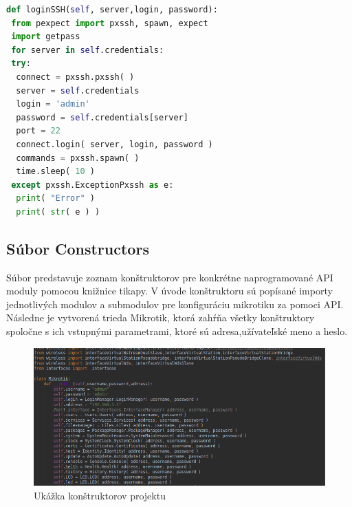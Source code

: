 \begin{lstlisting}[language=python, frame=single, caption=Metóda hromadného prihlásenia pomocou protokolu SSH,captionpos=b, showstringspaces=false, basicstyle=\footnotesize]
 def loginSSH(self, server,login, password):
 from pexpect import pxssh, spawn, expect
 import getpass
 for server in self.credentials:
 try:
  connect = pxssh.pxssh( )
  server = self.credentials
  login = 'admin'
  password = self.credentials[server]
  port = 22
  connect.login( server, login, password )
  commands = pxssh.spawn( )
  time.sleep( 10 )
 except pxssh.ExceptionPxssh as e:
  print( "Error" )
  print( str( e ) )
\end{lstlisting}
\subsection{Súbor Constructors}
Súbor predstavuje zoznam konštruktorov pre konkrétne naprogramované API moduly pomocou knižnice tikapy. V úvode konštruktoru sú popísané importy jednotlivých modulov a submodulov pre konfiguráciu mikrotiku za pomoci API. \\
Následne je vytvorená trieda Mikrotik, ktorá zahŕňa všetky konštruktory spoločne s ich vstupnými parametrami, ktoré sú adresa,užívateľské meno a heslo. 
\begin{figure}[H]
\centering
\includegraphics[scale=0.5]{../text/constructors.png}
\caption{Ukážka konštruktorov projektu}
\label{fig:constructors}
\end{figure} 
